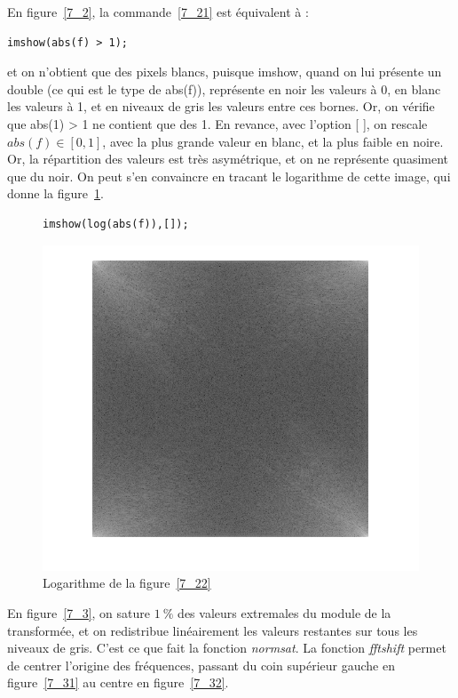 \documentclass[12pt,a4paper,onecolumn]{article}
\begin{document}
En figure~\ref{7_2}, la commande~\ref{7_21} est équivalent à :
\begin{lstlisting}[numbers = none]
imshow(abs(f) > 1);
\end{lstlisting}
et on n'obtient que des pixels blancs, puisque imshow, quand on lui présente un double (ce qui est le type de abs(f)), représente en noir les valeurs à 0, en blanc les valeurs à 1, et en niveaux de gris les valeurs entre ces bornes. Or, on vérifie que abs(1) > 1 ne contient que des 1. En revance, avec l'option [ ], on rescale \(abs(f) \in [0, 1]\), avec la plus grande valeur en blanc, et la plus faible en noire. Or, la répartition des valeurs est très asymétrique, et on ne représente quasiment que du noir. On peut s'en convaincre en tracant le logarithme de cette image, qui donne la figure~\ref{7_33}.

\begin{figure}[H]
	\centering
	\begin{lstlisting}[frame=none, numbers = none]
	imshow(log(abs(f)),[]);
	\end{lstlisting}
	\includegraphics[height = 0.3\textheight]{7_33}
	\caption{Logarithme de la figure~\ref{7_22}}
	\label{7_33}
\end{figure}

En figure~\ref{7_3}, on sature \(1~\%\) des valeurs extremales du module de la transformée, et on redistribue linéairement les valeurs restantes sur tous les niveaux de gris. C'est ce que fait la fonction \textit{normsat}. La fonction \textit{fftshift} permet de centrer l'origine des fréquences, passant du coin supérieur gauche en figure~\ref{7_31} au centre en figure~\ref{7_32}.
\end{document}
